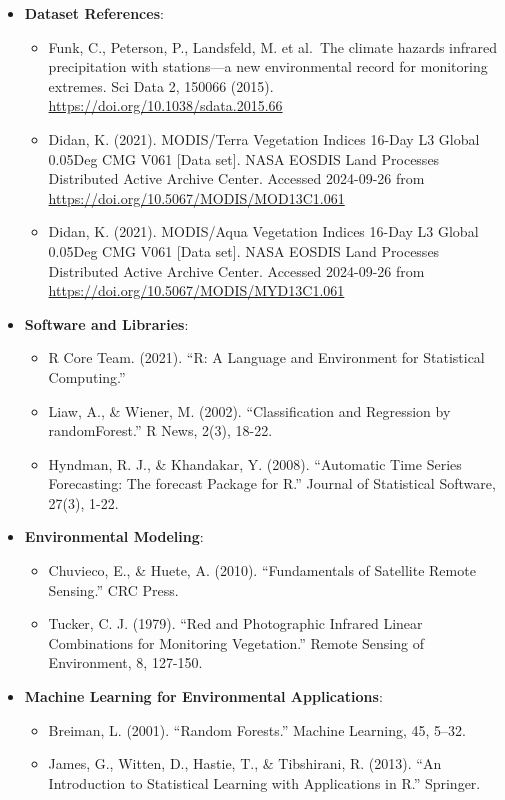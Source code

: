 \documentclass[
]{article}
\providecommand{\tightlist}{%
  \setlength{\itemsep}{0pt}\setlength{\parskip}{0pt}}
\begin{document}
\begin{itemize}
\tightlist
\item
  \textbf{Dataset References}:

  \begin{itemize}
  \tightlist
  \item
    Funk, C., Peterson, P., Landsfeld, M. et al.~The climate hazards
    infrared precipitation with stations---a new environmental record
    for monitoring extremes. Sci Data 2, 150066 (2015).
    \url{https://doi.org/10.1038/sdata.2015.66}
  \item
    Didan, K. (2021). MODIS/Terra Vegetation Indices 16-Day L3 Global
    0.05Deg CMG V061 {[}Data set{]}. NASA EOSDIS Land Processes
    Distributed Active Archive Center. Accessed 2024-09-26 from
    \url{https://doi.org/10.5067/MODIS/MOD13C1.061}
  \item
    Didan, K. (2021). MODIS/Aqua Vegetation Indices 16-Day L3 Global
    0.05Deg CMG V061 {[}Data set{]}. NASA EOSDIS Land Processes
    Distributed Active Archive Center. Accessed 2024-09-26 from
    \url{https://doi.org/10.5067/MODIS/MYD13C1.061}
  \end{itemize}
\item
  \textbf{Software and Libraries}:

  \begin{itemize}
  \tightlist
  \item
    R Core Team. (2021). ``R: A Language and Environment for Statistical
    Computing.''
  \item
    Liaw, A., \& Wiener, M. (2002). ``Classification and Regression by
    randomForest.'' R News, 2(3), 18-22.
  \item
    Hyndman, R. J., \& Khandakar, Y. (2008). ``Automatic Time Series
    Forecasting: The forecast Package for R.'' Journal of Statistical
    Software, 27(3), 1-22.
  \end{itemize}
\item
  \textbf{Environmental Modeling}:

  \begin{itemize}
  \tightlist
  \item
    Chuvieco, E., \& Huete, A. (2010). ``Fundamentals of Satellite
    Remote Sensing.'' CRC Press.
  \item
    Tucker, C. J. (1979). ``Red and Photographic Infrared Linear
    Combinations for Monitoring Vegetation.'' Remote Sensing of
    Environment, 8, 127-150.
  \end{itemize}
\item
  \textbf{Machine Learning for Environmental Applications}:

  \begin{itemize}
  \tightlist
  \item
    Breiman, L. (2001). ``Random Forests.'' Machine Learning, 45, 5--32.
  \item
    James, G., Witten, D., Hastie, T., \& Tibshirani, R. (2013). ``An
    Introduction to Statistical Learning with Applications in R.''
    Springer.
  \end{itemize}
\end{itemize}
\end{document}
